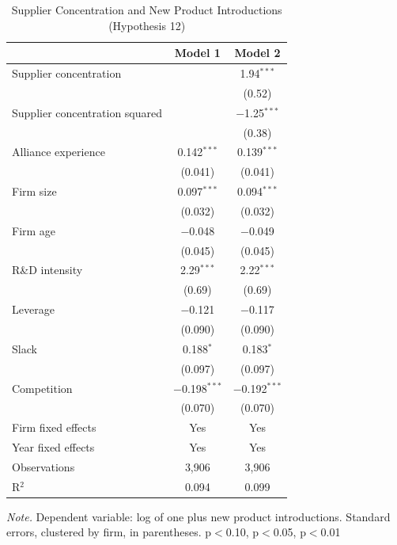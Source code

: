 \documentclass[12pt]{article}
\begin{document}
\begin{table}[p]
\centering\small
\caption{Supplier Concentration and New Product Introductions (Hypothesis 12)}
\begin{tabular}{lcc}
\toprule
 & Model 1 & Model 2 \\
\midrule
Supplier concentration &  & 1.94$^{***}$ \\
 &  & (0.52) \\[2pt]
Supplier concentration squared &  & $-$1.25$^{***}$ \\
 &  & (0.38) \\[2pt]
Alliance experience & 0.142$^{***}$ & 0.139$^{***}$ \\
 & (0.041) & (0.041) \\[2pt]
Firm size & 0.097$^{***}$ & 0.094$^{***}$ \\
 & (0.032) & (0.032) \\[2pt]
Firm age & $-$0.048 & $-$0.049 \\
 & (0.045) & (0.045) \\[2pt]
R\&D intensity & 2.29$^{***}$ & 2.22$^{***}$ \\
 & (0.69) & (0.69) \\[2pt]
Leverage & $-$0.121 & $-$0.117 \\
 & (0.090) & (0.090) \\[2pt]
Slack & 0.188$^{*}$ & 0.183$^{*}$ \\
 & (0.097) & (0.097) \\[2pt]
Competition & $-$0.198$^{***}$ & $-$0.192$^{***}$ \\
 & (0.070) & (0.070) \\[2pt]
\midrule
Firm fixed effects & Yes & Yes \\
Year fixed effects & Yes & Yes \\
Observations & 3,906 & 3,906 \\
R$^2$ & 0.094 & 0.099 \\
\bottomrule
\end{tabular}
\begin{minipage}{0.92\textwidth}\footnotesize\smallskip
\textit{Note.} Dependent variable: log of one plus new product introductions. Standard errors, clustered by firm, in parentheses. \textasteriskcentered{} p$<$0.10, \textasteriskcentered{}\textasteriskcentered{} p$<$0.05, \textasteriskcentered{}\textasteriskcentered{}\textasteriskcentered{} p$<$0.01
\end{minipage}
\end{table}
\clearpage
\end{document}
